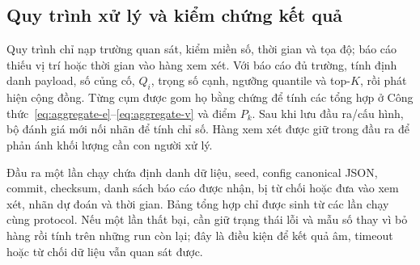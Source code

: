 \subsection{Quy trình xử lý và kiểm chứng kết quả}\label{sec:02-reproducibility}
Quy trình chỉ nạp trường quan sát, kiểm miền số, thời gian và tọa độ; báo cáo thiếu vị trí hoặc thời gian vào hàng xem xét. Với báo cáo đủ trường, tính định danh payload, số củng cố, $Q_i$, trọng số cạnh, ngưỡng quantile và top-$K$, rồi phát hiện cộng đồng. Từng cụm được gom họ bằng chứng để tính các tổng hợp ở Công thức~\ref{eq:aggregate-e}--\ref{eq:aggregate-v} và điểm $P_k$. Sau khi lưu đầu ra/cấu hình, bộ đánh giá mới nối nhãn để tính chỉ số. Hàng xem xét được giữ trong đầu ra để phản ánh khối lượng cần con người xử lý.

Đầu ra một lần chạy chứa định danh dữ liệu, seed, config canonical JSON, commit, checksum, danh sách báo cáo được nhận, bị từ chối hoặc đưa vào xem xét, nhãn dự đoán và thời gian. Bảng tổng hợp chỉ được sinh từ các lần chạy cùng protocol. Nếu một lần thất bại, cần giữ trạng thái lỗi và mẫu số thay vì bỏ hàng rồi tính trên những run còn lại; đây là điều kiện để kết quả âm, timeout hoặc từ chối dữ liệu vẫn quan sát được.
